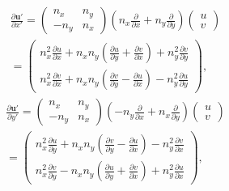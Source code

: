 \documentclass[review]{elsarticle}
\begin{document}
\begin{equation}\label{du'dx'}
	\begin{gathered}
		\frac{\partial{\bm{u}'}}{\partial{x'}}
			=\left(\begin{array}{cc}
						n_x & n_y \\
						-n_y & n_x
				   \end{array} 
			 \right)\left(n_x\frac{\partial}{\partial{x}} + n_y\frac{\partial}{\partial{y}}	\right) 
				 \left(\begin{array}{c} u \\ v \end{array} \right) \\
			=\left(\begin{array}{c}
				n_x^2\frac{\partial u}{\partial x}
				+n_xn_y\left(\frac{\partial u}{\partial y}+\frac{\partial v}{\partial x}\right)
			    +n_y^2\frac{\partial v}{\partial y}\\
			    n_x^2\frac{\partial v}{\partial x}
			    +n_xn_y\left(\frac{\partial v}{\partial y}-\frac{\partial u}{\partial x}\right)
			    -n_y^2\frac{\partial u}{\partial y}
			    \end{array}\right),
	\end{gathered}
\end{equation}
\begin{equation}\label{du'dy'}
	\begin{gathered}
	\frac{\partial{\bm{u}'}}{\partial{y'}} 
		= \left(\begin{array}{cc}
				n_x & n_y \\
				-n_y & n_x
		  \end{array} \right) 
		  \left(-n_y\frac{\partial}{\partial{x}} + n_x\frac{\partial}{\partial{y}} \right) 
		  \left(\begin{array}{c} u \\ v \end{array} \right)\\
		=\left(\begin{array}{c}
			n_x^2\frac{\partial u}{\partial y}
			+n_xn_y\left(\frac{\partial v}{\partial y}-\frac{\partial u}{\partial x}\right)
			-n_y^2\frac{\partial v}{\partial x}\\
			n_x^2\frac{\partial v}{\partial y}
			-n_xn_y\left(\frac{\partial u}{\partial y}+\frac{\partial v}{\partial x}\right)
			+n_y^2\frac{\partial u}{\partial x}
		\end{array}
		\right),
	\end{gathered}
\end{equation}
\end{document}
